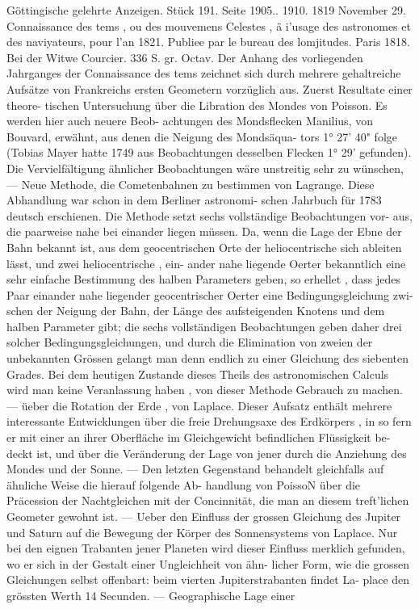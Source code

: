 \documentclass[12pt,a4paper]{article}
\begin{document}
{{{{{{{{Göttingische  gelehrte  Anzeigen.    Stück  191.  Seite  1905..  1910.     1819  November  29. Connaissance  des  tems ,  ou  des  mouvemens  Celestes ,  ä  i'usage  des  astronomes  et  des  naviyateurs,  pour l'an  1821.     Publiee  par  le  bureau  des  lomjitudes.     Paris  1818.     Bei  der  Witwe  Courcier.     336  S.  gr.  Octav. Der  Anhang  des  vorliegenden  Jahrganges  der  Connaissance  des  tems  zeichnet  sich  durch  mehrere gehaltreiche  Aufsätze  von  Frankreichs  ersten  Geometern  vorzüglich  aus.  Zuerst  Resultate  einer  theore- tischen Untersuchung  über  die  Libration  des  Mondes  von  Poisson.  Es  werden  hier  auch  neuere  Beob- achtungen des  Mondsflecken  Manilius,  von  Bouvard,  erwähnt,  aus  denen  die  Neigung  des  Mondsäqua- tors 1°  27'  40"  folge  (Tobias  Mayer  hatte  1749  aus  Beobachtungen  desselben  Flecken  1°  29'  gefunden). Die  Vervielfältigung  ähnlicher  Beobachtungen  wäre  unstreitig  sehr  zu  wünschen,  ---  Neue  Methode,  die Cometenbahnen  zu  bestimmen  von  Lagrange.  Diese  Abhandlung  war  schon  in  dem  Berliner  astronomi- schen Jahrbuch  für  1783  deutsch  erschienen.  Die  Methode  setzt  sechs  vollständige  Beobachtungen  vor- aus, die  paarweise  nahe  bei  einander  liegen  müssen.  Da,  wenn  die  Lage  der  Ebne  der  Bahn  bekannt ist,  aus  dem  geocentrischen  Orte  der  heliocentrische  sich  ableiten  lässt,  und  zwei  heliocentrische ,  ein- ander nahe  liegende  Oerter  bekanntlich  eine  sehr  einfache  Bestimmung  des  halben  Parameters  geben, so  erhellet ,  dass  jedes  Paar  einander  nahe  liegender  geocentrischer  Oerter  eine  Bedingungsgleichung  zwi- schen der  Neigung  der  Bahn,  der  Länge  des  aufsteigenden  Knotens  und  dem  halben  Parameter  gibt; die  sechs  vollständigen  Beobachtungen  geben  daher  drei  solcher  Bedingungsgleichungen,  und  durch  die Elimination  von  zweien  der  unbekannten  Grössen  gelangt  man  denn  endlich  zu  einer  Gleichung  des siebenten  Grades.  Bei  dem  heutigen  Zustande  dieses  Theils  des  astronomischen  Calculs  wird  man  keine Veranlassung  haben ,  von  dieser  Methode  Gebrauch  zu  machen.  ---  üeber  die  Rotation  der  Erde ,  von Laplace.  Dieser  Aufsatz  enthält  mehrere  interessante  Entwicklungen  über  die  freie  Drehungsaxe  des Erdkörpers ,  in  so  fern  er  mit  einer  an  ihrer  Oberfläche  im  Gleichgewicht  befindlichen  Flüssigkeit  be- deckt ist,  und  über  die  Veränderung  der  Lage  von  jener  durch  die  Anziehung  des  Mondes  und  der Sonne.  ---  Den  letzten  Gegenstand  behandelt  gleichfalls  auf  ähnliche  Weise  die  hierauf  folgende  Ab- handlung von  PoissoN  über  die  Präcession  der  Nachtgleichen  mit  der  Concinnität,  die  man  an  diesem treft'lichen  Geometer  gewohnt  ist.  ---  Ueber  den  Einfluss  der  grossen  Gleichung  des  Jupiter  und  Saturn auf  die  Bewegung  der  Körper  des  Sonnensystems  von  Laplace.  Nur  bei  den  eignen  Trabanten  jener Planeten  wird  dieser  Einfluss  merklich  gefunden,  wo  er  sich  in  der  Gestalt  einer  Ungleichheit  von  ähn- licher Form,  wie  die  grossen  Gleichungen  selbst  offenbart:  beim  vierten  Jupiterstrabanten  findet  La- place den  grössten  Werth  14  Secunden.  ---  Geographische  Lage  einer  }}}}}}}}
\end{document}
